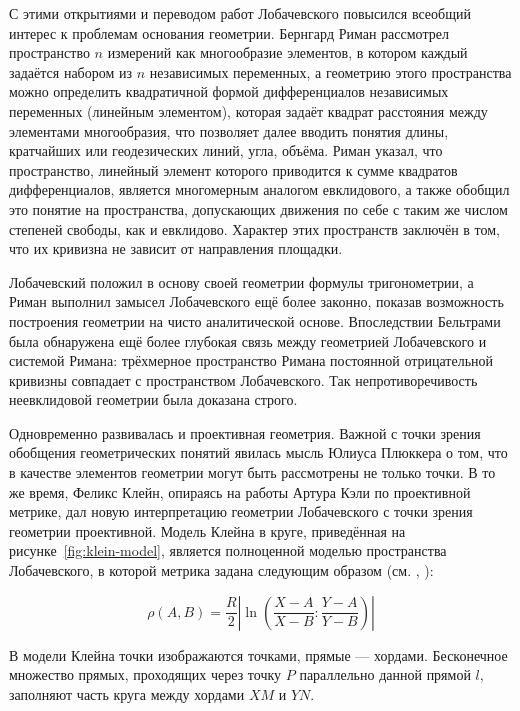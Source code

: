 \documentclass{article}
\numberwithin{equation}{section}
\providecommand{\abs}[1]{\left \lvert{#1}\right \rvert}
\begin{document}
С этими открытиями и переводом работ Лобачевского повысился всеобщий
интерес к проблемам основания геометрии. Бернгард Риман рассмотрел
пространство $n$ измерений как многообразие элементов, в котором
каждый задаётся набором из $n$ независимых переменных, а геометрию
этого пространства можно определить квадратичной формой дифференциалов
независимых переменных (линейным элементом), которая задаёт квадрат
расстояния между элементами многообразия, что позволяет далее вводить
понятия длины, кратчайших или геодезических линий, угла, объёма. Риман
указал, что пространство, линейный элемент которого приводится к сумме
квадратов дифференциалов, является многомерным аналогом евклидового, а
также обобщил это понятие на пространства, допускающих движения по
себе с таким же числом степеней свободы, как и евклидово. Характер
этих пространств заключён в том, что их кривизна не зависит от
направления площадки.

Лобачевский положил в основу своей геометрии формулы тригонометрии, а
Риман выполнил замысел Лобачевского ещё более законно, показав
возможность построения геометрии на чисто аналитической основе.
Впоследствии Бельтрами была обнаружена ещё более глубокая связь между
геометрией Лобачевского и системой Римана: трёхмерное пространство
Римана постоянной отрицательной кривизны совпадает с пространством
Лобачевского. Так непротиворечивость неевклидовой геометрии была
доказана строго.

Одновременно развивалась и проективная геометрия. Важной с точки
зрения обобщения геометрических понятий явилась мысль Юлиуса Плюккера
о том, что в качестве элементов геометрии могут быть рассмотрены не
только точки. В то же время, Феликс Клейн, опираясь на работы Артура
Кэли по проективной метрике, дал новую интерпретацию геометрии
Лобачевского с точки зрения геометрии проективной. Модель Клейна в
круге, приведённая на рисунке \ref{fig:klein-model}, является
полноценной моделью пространства Лобачевского, в которой метрика
задана следующим образом (см. \cite{prasolov04}, \cite{zaslavsky04}):

\begin{equation}\label{eq:projective-metric}
  \rho(A, B) = \frac{R}{2} \abs{\ln{\left (
        \frac{X-A}{X-B}:\frac{Y-A}{Y-B} \right )}}
\end{equation}

В модели Клейна точки изображаются точками, прямые — хордами.
Бесконечное множество прямых, проходящих через точку $P$ параллельно
данной прямой $l$, заполняют часть круга между хордами $XM$ и $YN$.
\end{document}
